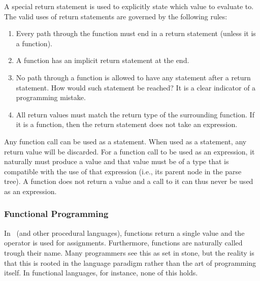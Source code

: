 A special return statement is used to explicitly state which value to evaluate to. The valid uses of return statements are governed by the following rules:
\begin{enumerate}
  \item Every path through the function must end in a return statement (unless it is a  function).
  \item A  function has an implicit return statement at the end.
  \item No path through a function is allowed to have any statement after a return statement. How would such statement be reached? It is a clear indicator of a programming mistake.
  \item All return values must match the return type of the surrounding function. If it is a  function, then the return statement does not take an expression.
\end{enumerate}

Any function call can be used as a statement. When used as a statement, any return value will be discarded. For a function call to be used as an expression, it naturally must produce a value and that value must be of a type that is compatible with the use of that expression (i.e., its parent node in the parse tree). A  function does not return a value and a call to it can thus never be used as an expression.

\subsubsection{Functional Programming}

In \csharp\ (and other procedural languages), functions return a single value and the \keywordname{=} operator is used for assignments. Furthermore, functions are naturally called trough their name. Many programmers see this as set in stone, but the reality is that this is rooted in the language paradigm rather than the art of programming itself. In functional languages, for instance, none of this holds.


